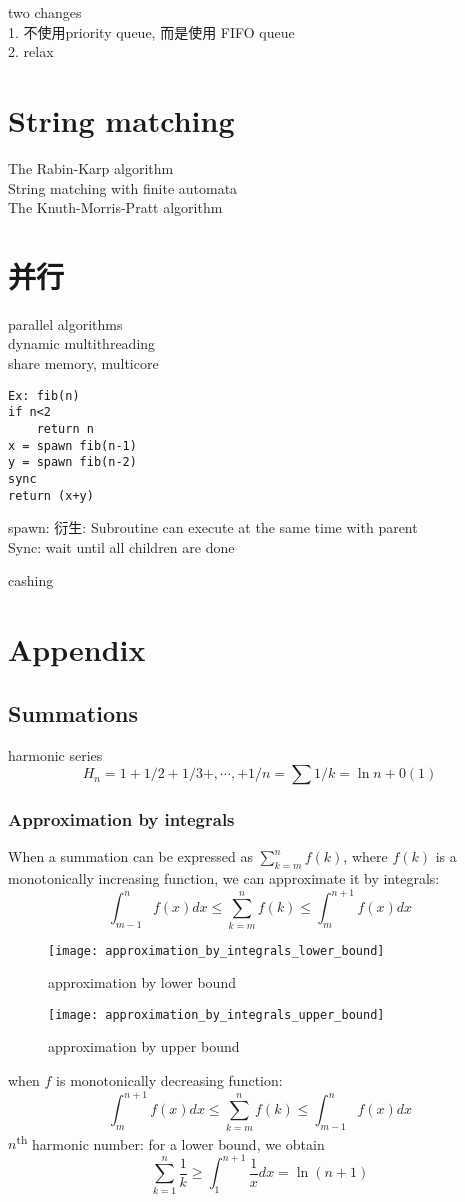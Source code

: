 \documentclass{article}
\begin{document}
two changes\\
1. 不使用priority queue, 而是使用 FIFO queue\\
2. relax

\section{String matching}
The Rabin-Karp algorithm\\
String matching with finite automata\\
The Knuth-Morris-Pratt algorithm

\section{并行}
\noindent
parallel algorithms\\
dynamic multithreading\\
share memory, multicore
\begin{verbatim}
Ex: fib(n)
if n<2
    return n
x = spawn fib(n-1)
y = spawn fib(n-2)
sync
return (x+y)
\end{verbatim}
spawn: 衍生: Subroutine can execute at the same time with parent\\
Sync: wait until all children are done

\noindent
cashing

\section{Appendix}
\subsection{Summations}
harmonic series
$$H_n = 1+1/2+1/3+,\cdots,+1/n=\sum 1/k=\ln n + 0(1)
$$
\subsubsection{Approximation by integrals}
When a summation can be expressed as $\sum_{k=m}^n f(k)$, where $f(k)$ is a monotonically increasing function, we can approximate it by integrals:
$$
\int_{m-1}^n f(x)dx \leq \sum_{k=m}^n f(k) \leq \int_m^{n+1} f(x)dx
$$

\begin{figure}[htbp]
\begin{minipage}[t]{0.5\textwidth}
	\centering
	\texttt{[image: approximation\_by\_integrals\_lower\_bound]}
  	\caption{approximation by lower bound}
  	\label{fig.approximation_by_integrals_lower_bound}
\end{minipage}
\begin{minipage}[t]{0.5\textwidth}
	\centering
	\texttt{[image: approximation\_by\_integrals\_upper\_bound]}
  	\caption{approximation by upper bound}
  	\label{fig.approximation_by_integrals_upper_bound}
\end{minipage}
\end{figure}
when $f$ is monotonically decreasing function:
$$
\int_m^{n+1} f(x)dx \leq \sum_{k=m}^n f(k) \leq \int_{m-1}^n f(x)dx
$$
$n$\textsuperscript{th} harmonic number:
for a lower bound, we obtain
$$
\sum_{k=1}^n \frac{1}{k} \geq \int_1^{n+1}\frac{1}{x}dx = \ln(n+1)
$$
\end{document}
